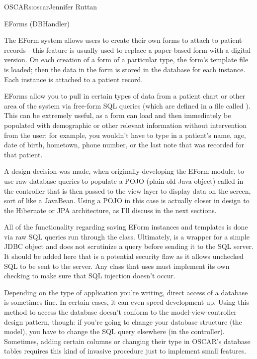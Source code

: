 \begin{aosachapter}{OSCAR}{s:oscar}{Jennifer Ruttan}
\begin{aosasect2}{EForms (DBHandler)}

The EForm system allows users to create their own forms to attach to
patient records---this feature is usually used to replace a
paper-based form with a digital version. 
On each creation of a form of a particular type, the form's template file is
loaded; then the data in the
form is stored in the database for each instance. Each instance is
attached to a patient record.

EForms allow you to pull in certain types of data from a patient chart
or other area of the system via free-form SQL queries (which are
defined in a file called ). This can be extremely
useful, as a form can load and then immediately be populated with
demographic or other relevant information without intervention from
the user; for example, you wouldn't have to type in a patient's name,
age, date of birth, hometown, phone number, or the last note that was
recorded for that patient.

A design decision was made, when originally developing the EForm module,
to use raw database queries to populate a POJO (plain-old Java object)
called  in the controller that is then passed to the view
layer to display data on the screen, sort of like a JavaBean. Using a
POJO in this case is actually closer in design to the Hibernate or JPA
architecture, as I'll discuss in the next sections.

All of the functionality regarding saving EForm instances and
templates is done via raw SQL queries run through the 
class. Ultimately,  is a wrapper for a simple JDBC
object and does not scrutinize a query before sending it to the SQL
server. It should be added here that  is a potential
security flaw as it allows unchecked SQL to be sent to the server. Any
class that uses
 must implement its own checking to make sure that SQL
injection doesn't occur.

Depending on the type of application you're writing, direct access of
a database is sometimes fine. In certain cases, it
can even speed development up. Using this method to access
the database doesn't conform to the model-view-controller design
pattern, though: if you're going to change your database structure
(the model), you have to change the SQL query elsewhere (in the
controller). Sometimes, adding certain columns or changing their type
in OSCAR's database tables requires this kind of invasive procedure
just to implement small features.


\end{aosasect2}
\end{aosachapter}
